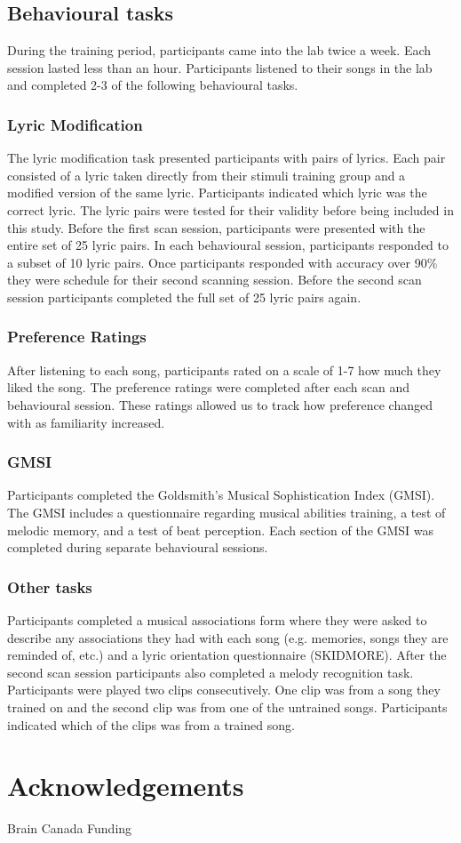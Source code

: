 \documentclass[12pt,letterpaper]{report}
\begin{document}
\subsection{Behavioural tasks}
During the training period, participants came into the lab twice a week.
Each session lasted less than an hour.
Participants listened to their songs in the lab and completed 2-3 of the following behavioural tasks. 
\subsubsection{Lyric Modification}
The lyric modification task presented participants with pairs of lyrics.
Each pair consisted of a lyric taken directly from their stimuli training group and a modified version of the same lyric. 
Participants indicated which lyric was the correct lyric.
The lyric pairs were tested for their validity before being included in this study. 
Before the first scan session, participants were presented with the entire set of 25 lyric pairs.
In each behavioural session, participants responded to a subset of 10 lyric pairs. 
Once participants responded with accuracy over 90\% they were schedule for their second scanning session.
Before the second scan session participants completed the full set of 25 lyric pairs again. 
\subsubsection{Preference Ratings}
After listening to each song, participants rated on a scale of 1-7 how much they liked the song.
The preference ratings were completed after each scan and behavioural session. 
These ratings allowed us to track how preference changed with as familiarity increased.
\subsubsection{GMSI}
Participants completed the Goldsmith's Musical Sophistication Index (GMSI).
The GMSI includes a questionnaire regarding musical abilities training, a test of melodic memory, and a test of beat perception.
Each section of the GMSI was completed during separate behavioural sessions. 
\subsubsection{Other tasks}
Participants completed a musical associations form where they were asked to describe any associations they had with each song (e.g. memories, songs they are reminded of, etc.) and a lyric orientation questionnaire (SKIDMORE). 
After the second scan session participants also completed a melody recognition task. 
Participants were played two clips consecutively. 
One clip was from a song they trained on and the second clip was from one of the untrained songs. 
Participants indicated which of the clips was from a trained song.
\section{Acknowledgements}
Brain Canada Funding
\end{document}
